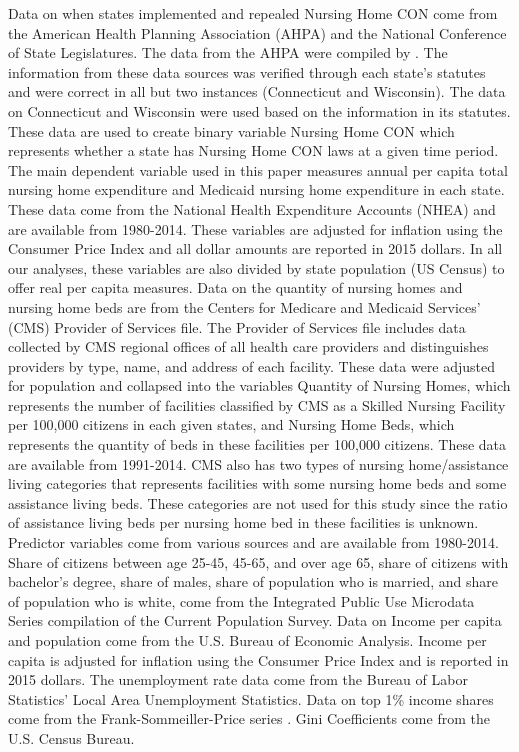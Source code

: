 \documentclass[../Main.tex]{subfiles}
\begin{document}
Data on when states implemented and repealed Nursing Home CON come from the American Health Planning Association (AHPA) and the National Conference of State Legislatures. The data from the AHPA were compiled by \citet{stratmann2014certificate}. The information from these data sources was verified through each state’s statutes and were correct in all but two instances (Connecticut and Wisconsin). The data on Connecticut and Wisconsin were used based on the information in its statutes. These data are used to create binary variable Nursing Home CON which represents whether a state has Nursing Home CON laws at a given time period.\\
\indent The main dependent variable used in this paper measures annual per capita total nursing home expenditure and Medicaid nursing home expenditure in each state. These data come from the National Health Expenditure Accounts (NHEA) and are available from 1980-2014. These variables are adjusted for inflation using the Consumer Price Index and all dollar amounts are reported in 2015 dollars. In all our analyses, these variables are also divided by state population (US Census) to offer real per capita measures. Data on the quantity of nursing homes and nursing home beds are from the Centers for Medicare and Medicaid Services’ (CMS) Provider of Services file. The Provider of Services file includes data collected by CMS regional offices of all health care providers and distinguishes providers by type, name, and address of each facility. These data were adjusted for population and collapsed into the variables Quantity of Nursing Homes, which represents the number of facilities classified by CMS as a Skilled Nursing Facility per 100,000 citizens in each given states, and Nursing Home Beds, which represents the quantity of beds in these facilities per 100,000 citizens. These data are available from 1991-2014. CMS also has two types of nursing home/assistance living categories that represents facilities with some nursing home beds and some assistance living beds. These categories are not used for this study since the ratio of assistance living beds per nursing home bed in these facilities is unknown. \\
\indent Predictor variables come from various sources and are available from 1980-2014. Share of citizens between age 25-45, 45-65, and over age 65, share of citizens with bachelor’s degree, share of males, share of population who is married, and share of population who is white, come from the Integrated Public Use Microdata Series compilation of the Current Population Survey. Data on Income per capita and population come from the U.S. Bureau of Economic Analysis. Income per capita is adjusted for inflation using the Consumer Price Index and is reported in 2015 dollars. The unemployment rate data come from the Bureau of Labor Statistics’ Local Area Unemployment Statistics. Data on top 1\% income shares come from the Frank-Sommeiller-Price series \citep{frank2015performance}. Gini Coefficients come from the U.S. Census Bureau.
\end{document}
